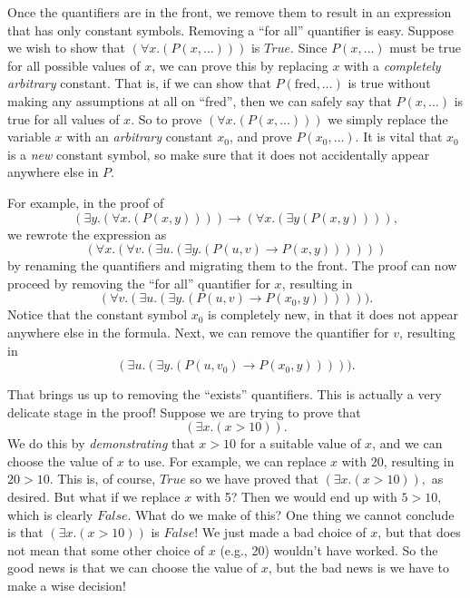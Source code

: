 {{Once the quantifiers are in the front, we remove them to result in an expression that has
only constant symbols. Removing a ``for all'' quantifier is easy. Suppose we wish to show
that $(\forall x.(P(x, \dots)))$ is $True$. Since $P(x, \dots)$ must be true for all possible
values of $x$, we can prove this by replacing $x$ with a \emph{completely arbitrary} constant.
That is, if we can show that $P(\text{fred}, \dots)$ is true without making any assumptions
at all on ``fred'', then we can safely say that $P(x, \dots)$ is true for all values of $x$.
So to prove $(\forall x.(P(x, \dots)))$ we simply replace the variable $x$ with an
\emph{arbitrary} constant $x_0$, and prove $P(x_0, \dots)$. It is vital that $x_0$ is a \emph{new}
constant symbol, so make sure that it does not accidentally appear anywhere else in $P$.

For example, in the proof of 
$$(\exists y.(\forall x.(P(x, y)))) \rightarrow (\forall x.(\exists y (P(x, y)))),$$
we rewrote the expression as
$$(\forall x.(\forall v.(\exists u.(\exists y.(P(u, v) \rightarrow P(x, y))))))$$
by renaming the quantifiers and migrating them to the front. The proof can now proceed
by removing the ``for all'' quantifier for $x$, resulting in
$$(\forall v.(\exists u.(\exists y.(P(u, v) \rightarrow P(x_0, y)))))).$$
Notice that the constant symbol $x_0$ is completely new, in that it does not appear anywhere
else in the formula. Next, we can remove the quantifier for $v$, resulting in
$$(\exists u.(\exists y.(P(u, v_0) \rightarrow P(x_0, y))))).$$

That brings us up to removing the ``exists'' quantifiers. This is actually a very delicate
stage in the proof! Suppose we are trying to prove that
$$(\exists x.(x > 10)).$$
We do this by \emph{demonstrating} that $x>10$ for a suitable value of $x$, and we can choose
the value of $x$ to use. For example, we
can replace $x$ with 20, resulting in $20 > 10.$ This is, of course, $True$ so we have
proved that $(\exists x.(x > 10)),$ as desired. But what if we replace $x$ with 5? Then we
would end up with $5 > 10,$ which is clearly $False$. What do we make of this? One thing
we cannot conclude is that $(\exists x.(x > 10))$ is $False$! We just made a bad choice of $x$,
but that does not mean that some other choice of $x$ (e.g., 20) wouldn't have worked. So
the good news is that we can choose the value of $x$, but the bad news is we have to make
a wise decision!

}}
